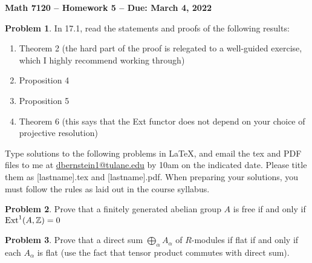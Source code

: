 \documentclass[letterpaper,11pt]{amsart}
\theoremstyle{plain}
\theoremstyle{definition}
\newtheorem{pr}{Problem}
\theoremstyle{remark}
\begin{document}
\Large

\begin{center}
{\bf Math 7120 -- Homework  5 --  Due:  March 4, 2022}
\end{center}

\normalsize

\medskip


\begin{pr}
    In 17.1, read the statements and proofs of the following results:
    \begin{enumerate}
        \item Theorem 2 (the hard part of the proof is relegated to a well-guided exercise, which I highly recommend working through)
        \item Proposition 4
        \item Proposition 5
        \item Theorem 6 (this says that the Ext functor does not depend on your choice of projective resolution)
    \end{enumerate}
\end{pr}








\bigskip

Type solutions to the following problems in \LaTeX, and email the tex and PDF files to me at \url{dbernstein1@tulane.edu} by 10am on the indicated date.
Please title them as [lastname].tex and [lastname].pdf.
When preparing your solutions, you must follow the rules as laid out in the course syllabus.

\vspace{.5cm}


\begin{pr}
    Prove that a finitely generated abelian group $A$ is free if and only if ${\rm Ext}^{1}(A,\mathbb{Z}) = 0$
\end{pr}

\begin{pr}
    Prove that a direct sum $\bigoplus_\alpha A_\alpha$ of $R$-modules if flat if and only if each $A_\alpha$ is flat (use the fact that tensor product commutes with direct sum).
\end{pr}
\end{document}
